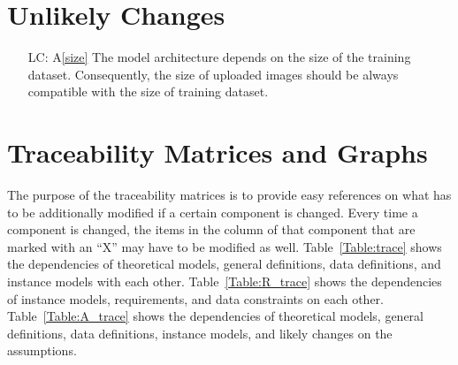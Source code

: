 \documentclass[12pt]{article}
\newcommand{\aref}[1]{A\ref{#1}}
\newcounter{lcnum} %
\begin{document}
\section{Unlikely Changes}    

\noindent \begin{itemize}

\item[LC\refstepcounter{lcnum}\thelcnum\label{LC_size}:] 
\aref{size} The model architecture depends on the size of the training dataset. 
Consequently, the size of uploaded images should be always compatible with the size 
of training dataset.

\end{itemize}

\section{Traceability Matrices and Graphs}

The purpose of the traceability matrices is to provide easy references on what
has to be additionally modified if a certain component is changed.  Every time a
component is changed, the items in the column of that component that are marked
with an ``X'' may have to be modified as well.  Table~\ref{Table:trace} shows the
dependencies of theoretical models, general definitions, data definitions, and
instance models with each other. Table~\ref{Table:R_trace} shows the
dependencies of instance models, requirements, and data constraints on each
other. Table~\ref{Table:A_trace} shows the dependencies of theoretical models,
general definitions, data definitions, instance models, and likely changes on
the assumptions.



\end{document}

